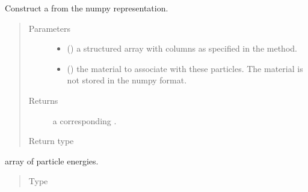 \documentclass[letterpaper,10pt,english]{sphinxmanual}
\begin{document}
\begin{fulllineitems}
\begin{fulllineitems}
\label{\detokenize{code_structure:scdc.particle.ParticleCollection.from_npy}}
Construct a  from the numpy representation.
\begin{quote}\begin{description}
\item[{Parameters}] \leavevmode\begin{itemize}
\item {} 
 () \textendash{} a structured array with columns as specified
in the  method.

\item {} 
 () \textendash{} the material to associate with these
particles. The material is not stored in the numpy format.

\end{itemize}

\item[{Returns}] \leavevmode
a corresponding .

\item[{Return type}] \leavevmode
{\hyperref[\detokenize{code_structure:scdc.particle.ParticleCollection}]{}}

\end{description}\end{quote}

\end{fulllineitems}


\begin{fulllineitems}
\label{\detokenize{code_structure:id4}}
array of particle energies.
\begin{quote}\begin{description}
\item[{Type}] \leavevmode
{}


\end{description}
\end{quote}
\end{fulllineitems}
\end{fulllineitems}
\end{document}
